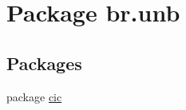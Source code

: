 \hypertarget{namespacebr_1_1unb}{}\section{Package br.\+unb}
\label{namespacebr_1_1unb}
\subsection*{Packages}
\begin{DoxyCompactItemize}
\item 
package \mbox{\hyperlink{namespacebr_1_1unb_1_1cic}{cic}}
\end{DoxyCompactItemize}

